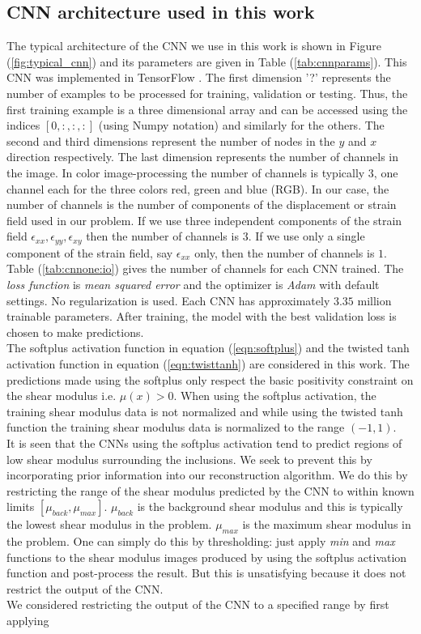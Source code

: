 \documentclass[12pt]{article}
\begin{document}
\subsection{\label{sect:cnnarch} CNN architecture used in this work}
The typical architecture of the CNN we use in this work is shown in Figure (\ref{fig:typical_cnn}) and its parameters are given in Table (\ref{tab:cnnparams}). This CNN was implemented in TensorFlow \cite{misc:tensorflow}. The first dimension '?' represents the number of examples to be processed for training, validation or testing. Thus, the first training example is a three dimensional array and can be accessed using the indices $[0,:,:,:]$ (using Numpy notation) and similarly for the others. The second and third dimensions represent the number of nodes in the $y$ and $x$ direction respectively. The last dimension represents the number of channels in the image. In color image-processing the number of channels is typically $3$, one channel each for the three colors red, green and blue (RGB). In our case, the number of channels is the number of components of the displacement or strain field used in our problem. If we use three independent components of the strain field $\epsilon_{xx},\epsilon_{yy},\epsilon_{xy}$ then the number of channels is $3$. If we use only a single component of the strain field, say $\epsilon_{xx}$ only, then the number of channels is $1$. Table (\ref{tab:cnnone:io}) gives the number of channels for each CNN trained. The \textit{loss function} is \textit{mean squared error} and the optimizer is \textit{Adam} with default settings. No regularization is used.  Each CNN has approximately $3.35$ million trainable parameters. After training, the model with the best validation loss is chosen to make predictions.\\The softplus activation function in equation (\ref{eqn:softplus}) and the twisted tanh activation function in equation (\ref{eqn:twisttanh}) are considered in this work. The predictions made using the softplus only respect the basic positivity constraint on the shear modulus i.e. $\mu(x) > 0$. When using the softplus activation, the training shear modulus data is not normalized and while using the twisted tanh function the training shear modulus data is normalized to the range $(-1,1)$.\\ It is seen that the CNNs using the softplus activation tend to predict regions of low shear modulus surrounding the inclusions. We seek to prevent this by incorporating prior information into our reconstruction algorithm. We do this by restricting the range of the shear modulus predicted by the CNN to within known limits $[\mu_{back},\mu_{max}]$. $\mu_{back}$ is the background shear modulus and this is typically the lowest shear modulus in the problem. $\mu_{max}$ is the maximum shear modulus in the problem. One can simply do this by thresholding: just apply \textit{min} and \textit{max} functions to the shear modulus images produced by using the softplus activation function and post-process the result. But this is unsatisfying because it does not restrict the output of the CNN. \\We considered restricting the output of the CNN to a specified range by first applying 
\end{document}
